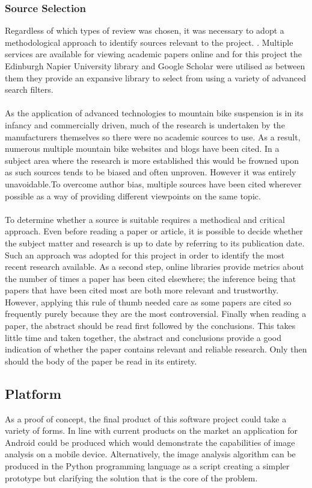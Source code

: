 		\subsubsection{Source Selection}
			Regardless of which types of review was chosen, it was necessary to adopt a methodological approach to identify sources relevant to the project. . Multiple services are available for viewing academic papers online and for this project the Edinburgh Napier University library and Google Scholar were utilised as between them they provide  an expansive library to select from  using  a variety of advanced search filters.
			\\\\
			As the   application of advanced technologies to mountain bike suspension is in its infancy and commercially driven, much of the research is undertaken by the manufacturers themselves so there were  no academic sources to use. As a result, numerous  multiple mountain bike websites and blogs have been cited. In a subject area where the research is more established this would be frowned upon as such  sources tends to be biased and often unproven. However it was entirely unavoidable.To overcome author bias,  multiple sources have been cited wherever possible as a way of providing different viewpoints on the same topic.
			\\\\
			To determine whether a source is suitable requires a methodical and critical approach.  Even before reading a  paper or article, it is possible to  decide  whether the subject matter and research is up to date by referring to its  publication date. Such an approach was  adopted for this project in order to identify  the most recent research available. As a second step, online libraries provide metrics about  the number of times a paper has been cited elsewhere; the inference being that  papers that have  been cited most  are both more relevant and  trustworthy. However,  applying this rule of thumb needed care as some papers are  cited so frequently purely because they are the most controversial. Finally when reading a paper, the abstract should be read first followed by the conclusions. This takes little time and taken together, the abstract and conclusions provide a good indication of whether the paper contains  relevant and reliable research. Only then should the body of the paper be read in its entirety. 
	\subsection{Platform}
		As a proof of concept, the final product of this software project could take a variety of forms. In line with current products on the market an application for Android could be produced which would demonstrate the capabilities of image analysis on a mobile device. Alternatively, the image analysis algorithm can be produced in the Python programming language as a script creating a simpler prototype but clarifying the solution that is the core of  the problem.
